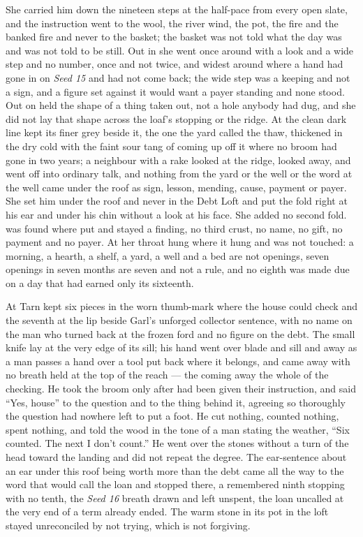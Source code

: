 She carried him down the nineteen steps at the half-pace from every open slate, and the instruction went to the wool, the river wind, the pot, the fire and the banked fire and never to the basket; the basket was not told what the day was and was not told to be still. Out in  she went once around  with a look and a wide step and no number, once and not twice, and widest around  where a hand had gone in on \emph{Seed 15} and had not come back; the wide step was a keeping and not a sign, and a figure set against it would want a payer standing and none stood. Out on   held the shape of a thing taken out, not a hole anybody had dug, and she did not lay that shape across the loaf's stopping or the ridge. At  the clean dark line kept its finer grey beside it, the one the yard called the thaw, thickened in the dry cold with the faint sour tang of  coming up off it where no broom had gone in two years; a neighbour with a rake looked at the ridge, looked away, and went off into ordinary talk, and nothing from the yard or the well or the word at the well came under the roof as sign, lesson, mending, cause, payment or payer. She set him under the roof and never in the Debt Loft and put the fold right at his ear and under his chin without a look at his face. She added no second fold.  was found where put and stayed a finding, no third crust, no name, no gift, no payment and no payer. At her throat  hung where it hung and was not touched: a morning, a hearth, a shelf, a yard, a well and a bed are not openings, seven openings in seven months are seven and not a rule, and no eighth was made due on a day that had earned only its sixteenth.

At  Tarn kept six pieces in the worn thumb-mark where the house could check and the seventh at the lip beside Garl's unforged collector sentence, with no name on the man who turned back at the frozen ford and no figure on the debt. The small knife lay at the very edge of its sill; his hand went over blade and sill and away as a man passes a hand over a tool put back where it belongs, and came away with no breath held at the top of the reach --- the coming away the whole of the checking. He took the broom only after  had been given their instruction, and said “Yes, house” to the question and to the thing behind it, agreeing so thoroughly the question had nowhere left to put a foot. He cut nothing, counted nothing, spent nothing, and told the wood in the tone of a man stating the weather, “Six counted. The next I don't count.” He went over the stones without a turn of the head toward the landing and did not repeat the degree. The ear-sentence about an ear under this roof being worth more than the debt came all the way to the word that would call the loan and stopped there, a remembered ninth stopping with no tenth, the \emph{Seed 16} breath drawn and left unspent, the loan uncalled at the very end of a term already ended. The warm stone in its pot in the loft stayed unreconciled by not trying, which is not forgiving.

